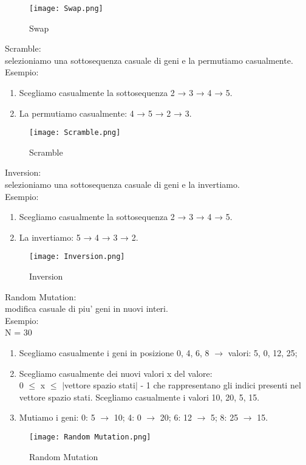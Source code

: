 \documentclass[10pt,a4paper]{article}
\begin{document}
    \begin{figure}[h!]
      \centering
      \caption{Swap}
      \texttt{[image: Swap.png]}
      \label{Swap}
    \end{figure}
    
    Scramble:\\
    selezioniamo una sottosequenza casuale di geni e la permutiamo casualmente.
    Esempio:\\
    \begin{enumerate}
      \item Scegliamo casualmente la sottosequenza 2 → 3 → 4 → 5.
      \item La permutiamo casualmente: 4 → 5 → 2 → 3.
    \end{enumerate}
    \begin{figure}[h!]
      \centering
      \caption{Scramble}
      \texttt{[image: Scramble.png]}
      \label{Scramble}
    \end{figure}
     
    Inversion:\\
    selezioniamo una sottosequenza casuale di geni e la invertiamo.\\
    Esempio:\\
    \begin{enumerate}
      \item Scegliamo casualmente la sottosequenza 2 → 3 → 4 → 5.
      \item La invertiamo: 5 → 4 → 3 → 2.
    \end{enumerate}
    \begin{figure}[h!]
      \centering
      \caption{Inversion}
      \texttt{[image: Inversion.png]}
      \label{Inversion}
    \end{figure}
    
    Random Mutation:\\
    modifica casuale di piu' geni in nuovi interi.\\
    Esempio:\\
    N = 30\\
    \begin{enumerate}
      \item Scegliamo casualmente i geni in posizione 0, 4, 6, 8 $ \rightarrow$ valori: 5, 0, 12, 25;
      \item Scegliamo casualmente dei nuovi valori x del valore: \\ 0 $\leq$ x $\leq$ $\mid$vettore spazio stati$\mid$ - 1 che rappresentano gli indici presenti 
      nel vettore spazio stati. Scegliamo casualmente i valori 10, 20, 5, 15.
      \item Mutiamo i geni: 0: 5 $ \rightarrow$ 10;     4: 0 $ \rightarrow$ 20;     6: 12 $ \rightarrow$ 5;     8: 25 $ \rightarrow$ 15.
    \end{enumerate}
    \begin{figure}[h!]
      \centering
      \caption{Random Mutation}
      \texttt{[image: Random Mutation.png]}
      \label{Random Resetting}
    \end{figure}
    
\end{document}
